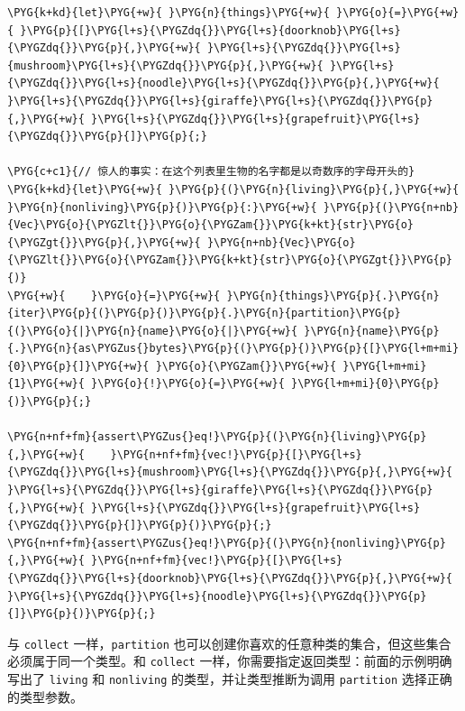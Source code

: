 \begin{Verbatim}[commandchars=\\\{\},breaklines=true,breakanywhere=true,fontsize=\codefont,xleftmargin=17bp]
\PYG{k+kd}{let}\PYG{+w}{ }\PYG{n}{things}\PYG{+w}{ }\PYG{o}{=}\PYG{+w}{ }\PYG{p}{[}\PYG{l+s}{\PYGZdq{}}\PYG{l+s}{doorknob}\PYG{l+s}{\PYGZdq{}}\PYG{p}{,}\PYG{+w}{ }\PYG{l+s}{\PYGZdq{}}\PYG{l+s}{mushroom}\PYG{l+s}{\PYGZdq{}}\PYG{p}{,}\PYG{+w}{ }\PYG{l+s}{\PYGZdq{}}\PYG{l+s}{noodle}\PYG{l+s}{\PYGZdq{}}\PYG{p}{,}\PYG{+w}{ }\PYG{l+s}{\PYGZdq{}}\PYG{l+s}{giraffe}\PYG{l+s}{\PYGZdq{}}\PYG{p}{,}\PYG{+w}{ }\PYG{l+s}{\PYGZdq{}}\PYG{l+s}{grapefruit}\PYG{l+s}{\PYGZdq{}}\PYG{p}{]}\PYG{p}{;}

\PYG{c+c1}{// 惊人的事实：在这个列表里生物的名字都是以奇数序的字母开头的}
\PYG{k+kd}{let}\PYG{+w}{ }\PYG{p}{(}\PYG{n}{living}\PYG{p}{,}\PYG{+w}{ }\PYG{n}{nonliving}\PYG{p}{)}\PYG{p}{:}\PYG{+w}{ }\PYG{p}{(}\PYG{n+nb}{Vec}\PYG{o}{\PYGZlt{}}\PYG{o}{\PYGZam{}}\PYG{k+kt}{str}\PYG{o}{\PYGZgt{}}\PYG{p}{,}\PYG{+w}{ }\PYG{n+nb}{Vec}\PYG{o}{\PYGZlt{}}\PYG{o}{\PYGZam{}}\PYG{k+kt}{str}\PYG{o}{\PYGZgt{}}\PYG{p}{)}
\PYG{+w}{    }\PYG{o}{=}\PYG{+w}{ }\PYG{n}{things}\PYG{p}{.}\PYG{n}{iter}\PYG{p}{(}\PYG{p}{)}\PYG{p}{.}\PYG{n}{partition}\PYG{p}{(}\PYG{o}{|}\PYG{n}{name}\PYG{o}{|}\PYG{+w}{ }\PYG{n}{name}\PYG{p}{.}\PYG{n}{as\PYGZus{}bytes}\PYG{p}{(}\PYG{p}{)}\PYG{p}{[}\PYG{l+m+mi}{0}\PYG{p}{]}\PYG{+w}{ }\PYG{o}{\PYGZam{}}\PYG{+w}{ }\PYG{l+m+mi}{1}\PYG{+w}{ }\PYG{o}{!}\PYG{o}{=}\PYG{+w}{ }\PYG{l+m+mi}{0}\PYG{p}{)}\PYG{p}{;}

\PYG{n+nf+fm}{assert\PYGZus{}eq!}\PYG{p}{(}\PYG{n}{living}\PYG{p}{,}\PYG{+w}{    }\PYG{n+nf+fm}{vec!}\PYG{p}{[}\PYG{l+s}{\PYGZdq{}}\PYG{l+s}{mushroom}\PYG{l+s}{\PYGZdq{}}\PYG{p}{,}\PYG{+w}{ }\PYG{l+s}{\PYGZdq{}}\PYG{l+s}{giraffe}\PYG{l+s}{\PYGZdq{}}\PYG{p}{,}\PYG{+w}{ }\PYG{l+s}{\PYGZdq{}}\PYG{l+s}{grapefruit}\PYG{l+s}{\PYGZdq{}}\PYG{p}{]}\PYG{p}{)}\PYG{p}{;}
\PYG{n+nf+fm}{assert\PYGZus{}eq!}\PYG{p}{(}\PYG{n}{nonliving}\PYG{p}{,}\PYG{+w}{ }\PYG{n+nf+fm}{vec!}\PYG{p}{[}\PYG{l+s}{\PYGZdq{}}\PYG{l+s}{doorknob}\PYG{l+s}{\PYGZdq{}}\PYG{p}{,}\PYG{+w}{ }\PYG{l+s}{\PYGZdq{}}\PYG{l+s}{noodle}\PYG{l+s}{\PYGZdq{}}\PYG{p}{]}\PYG{p}{)}\PYG{p}{;}
\end{Verbatim}

与 \texttt{collect} 一样，\texttt{partition} 也可以创建你喜欢的任意种类的集合，但这些集合必须属于同一个类型。和 \texttt{collect} 一样，你需要指定返回类型：前面的示例明确写出了 \texttt{living} 和 \texttt{nonliving} 的类型，并让类型推断为调用 \texttt{partition} 选择正确的类型参数。

